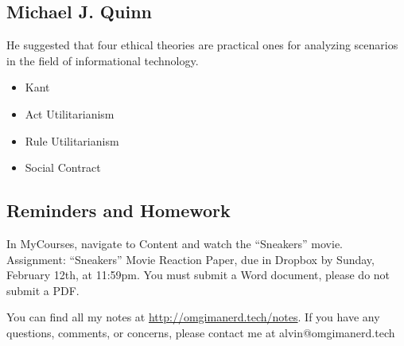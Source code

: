 \documentclass[letterpaper, 12pt]{article}
\begin{document}
\subsection*{Michael J. Quinn}
He suggested that four ethical theories are practical ones for analyzing
scenarios in the field of informational technology.
\begin{itemize}
  \item Kant
  \item Act Utilitarianism
  \item Rule Utilitarianism
  \item Social Contract
\end{itemize}

\subsection*{Reminders and Homework}
In MyCourses, navigate to Content and watch the ``Sneakers'' movie. \\
Assignment: ``Sneakers'' Movie Reaction Paper, due in Dropbox by Sunday,
February 12th, at 11:59pm.
You must submit a Word document, please do not submit a PDF.

\begin{center}
  You can find all my notes at \url{http://omgimanerd.tech/notes}. If you have
  any questions, comments, or concerns, please contact me at
  alvin@omgimanerd.tech
\end{center}
\end{document}

